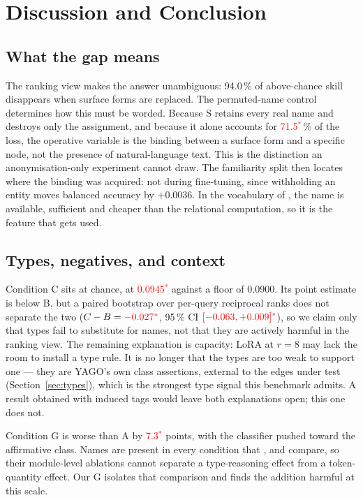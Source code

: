 \documentclass[conference]{IEEEtran}
\newcommand{\pv}[1]{\textcolor{red}{#1\ensuremath{^{\ast}}}}
\begin{document}
\section{Discussion and Conclusion}
\label{sec:disc}

\subsection{What the gap means}

The ranking view makes the answer unambiguous:
94.0\,\% of above-chance skill disappears when surface forms are replaced. The
permuted-name control determines how this must be worded. Because S retains
every real name and destroys only the assignment, and because it alone accounts
for \pv{71.5}\,\% of the loss, the operative variable is the binding between a
surface form and a specific node, not the presence of natural-language text.
This is the distinction an anonymisation-only experiment cannot draw. The
familiarity split then locates where the binding was acquired: not during
fine-tuning, since withholding an entity moves balanced accuracy by $+0.0036$.
In the vocabulary of \cite{geirhos2020}, the name is available, sufficient and
cheaper than the relational computation, so it is the feature that gets used.

\subsection{Types, negatives, and context}

Condition C sits at chance, at \pv{0.0945} against a floor of 0.0900.
Its point estimate is below B, but a paired bootstrap over per-query reciprocal
ranks does not separate the two ($C-B=\pv{-0.027}$, 95\,\% CI
$\pv{[-0.063,+0.009]}$), so we claim only that types fail to substitute for
names, not that they are actively harmful in the ranking view. The remaining
explanation is capacity: LoRA at $r=8$ may lack the room to install a type rule.
It is no longer that the types are too weak to support one --- they are YAGO's
own class assertions, external to the edges under test
(Section~\ref{sec:types}), which is the strongest type signal this benchmark
admits. A result obtained with induced tags would leave both explanations open;
this one does not.

Condition G is worse than A by \pv{7.3} points, with the classifier pushed
toward the affirmative class. Names are present in every condition that
\cite{cats}, \cite{knit} and \cite{realkgc} compare, so their module-level
ablations cannot separate a type-reasoning effect from a token-quantity effect.
Our G isolates that comparison and finds the addition harmful at this scale.
\end{document}
